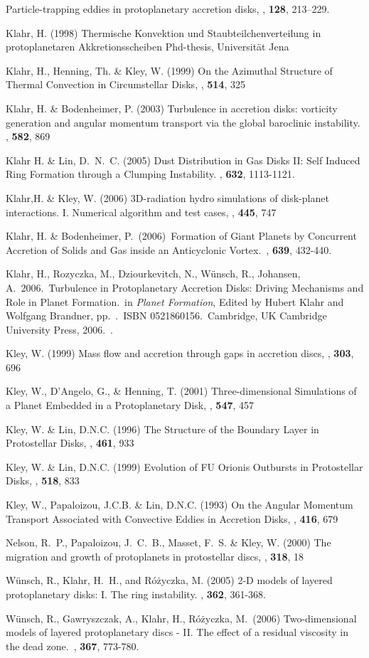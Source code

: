 \begin{ownpubl}
Particle-trapping eddies in protoplanetary accretion disks,
\ica, \textbf{128}, 213--229.   %
%
\item Klahr, H. (1998)
Thermische Konvektion und Staubteilchenverteilung in protoplanetaren Akkretionsscheiben
Phd-thesis, Universit\"at Jena
%
\item Klahr, H.,  Henning, Th. \& Kley, W. (1999)
 On the Azimuthal Structure of Thermal Convection in Circumstellar Disks,
 \apj, \textbf{514}, 325
%
\item Klahr, H. \& Bodenheimer, P. (2003)  Turbulence in accretion disks:
vorticity generation and angular momentum transport via the global
baroclinic instability. \apj, \textbf{582}, 869
%
\item Klahr H. \& Lin, D.~N.~C. (2005) Dust Distribution in Gas Disks II: Self 
Induced Ring Formation through a Clumping Instability. \apj, \textbf{632}, 
1113-1121.
%
%
\item Klahr,H. \& Kley, W. (2006)
 3D-radiation hydro simulations of disk-planet interactions. 
  I. Numerical algorithm and test cases,
  \aap, \textbf{445}, 747
%
\item Klahr, H. \& Bodenheimer, P.\ (2006)\ 
Formation of Giant Planets by Concurrent Accretion of Solids and Gas inside
an Anticyclonic Vortex.\ \apj, \textbf{639}, 432-440.
%
\item Klahr, H., Rozyczka, M., Dziourkevitch, N., W\"unsch, R., Johansen, A.\ 2006.\
Turbulence in Protoplanetary Accretion Disks: 
Driving Mechanisms and Role in Planet Formation.\ in  {\em Planet Formation},
Edited by Hubert Klahr and Wolfgang Brandner, pp.~.~ISBN 0521860156.~Cambridge, UK 
Cambridge University Press,  2006.\ . 
%
\item Kley, W. (1999)
  Mass flow and accretion through gaps in accretion discs,
  \mn, \textbf{303}, 696
\item Kley, W., {D'Angelo}, G., \& {Henning}, T. (2001)
  Three-dimensional Simulations of a Planet Embedded in a
   Protoplanetary Disk,
  \apj, \textbf{547}, 457
\item Kley, W. \& Lin, D.N.C. (1996)
  The Structure of the Boundary Layer in Protostellar Disks,
  \apj, \textbf{461}, 933
\item Kley, W. \& Lin, D.N.C. (1999)
  Evolution of FU Orionis Outbursts in Protostellar Disks,
  \apj, \textbf{518}, 833
\item Kley, W., Papaloizou, J.C.B. \& Lin, D.N.C. (1993)
 On the Angular Momentum Transport Associated with Convective
  Eddies in Accretion Disks,
  \apj, \textbf{416}, 679
\item Nelson, R.~P., {Papaloizou}, J.~C.~B., {Masset}, F.~S. \& Kley, W. (2000)
  The migration and growth of protoplanets in protostellar discs,
  \mn, \textbf{318}, 18
%
\item W\"unsch, R., Klahr, H.~H., and R\'o\.zyczka, M. (2005) 2-D models of layered
protoplanetary disks: I. The ring instability. \mn,  \textbf{362}, 361-368.
%
\item  W{\"u}nsch, R., Gawryszczak, A., Klahr, H., R{\'o}{\.z}yczka, M.\ (2006) 
Two-dimensional models of layered protoplanetary discs - II. The effect of a residual 
viscosity in the dead zone.\ \mn, \textbf{367}, 773-780.\
%
\end{ownpubl}
%
